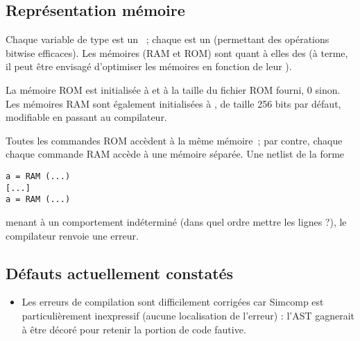 \documentclass[11pt,a4paper]{article}
\begin{document}
\subsection{Représentation mémoire} \label{sec:memory}

Chaque variable de type  est un ~; chaque  est un  (permettant des opérations bitwise efficaces). Les mémoires (RAM et ROM) sont quant à elles des  (à terme, il peut être envisagé d'optimiser les mémoires en fonction de leur ).

La mémoire ROM est initialisée à  et à la taille du fichier ROM fourni, 0 sinon. Les mémoires RAM sont également initialisées à , de taille 256 bits par défaut, modifiable en passant  au compilateur.

Toutes les commandes ROM accèdent à la même mémoire~; par contre, chaque chaque commande RAM accède à une mémoire séparée. Une netlist de la forme
\begin{lstlisting}
a = RAM (...)
[...]
a = RAM (...)
\end{lstlisting}
menant à un comportement indéterminé (dans quel ordre mettre les lignes ?), le compilateur renvoie une erreur.

\subsection{Défauts actuellement constatés}

\begin{itemize}
\item Les erreurs de compilation sont difficilement corrigées car Simcomp est particulièrement inexpressif (aucune localisation de l'erreur) : l'AST gagnerait à être décoré pour retenir la portion de code fautive.
\end{itemize}
\end{document}
